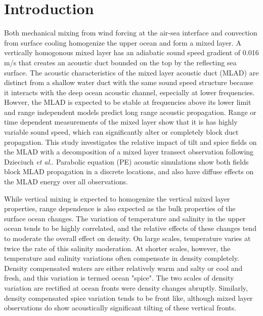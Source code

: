 \documentclass[preprint,NumberedRefs]{JASA}
\begin{document}
\section{\label{sec:intro} Introduction}
Both mechanical mixing from wind forcing at the air-sea interface and convection from surface cooling homogenize the upper ocean and form a mixed layer\citep{cole2010seasonal}. A vertically homogonous mixed layer has an adiabatic sound speed gradient of 0.016 m/s that creates an acoustic duct bounded on the top by the reflecting sea surface. The acoustic characteristics of the mixed layer acoustic duct (MLAD) are distinct from a shallow water duct with the same sound speed structure because it interacts with the deep ocean acoustic channel\citep{porter93}, especially at lower frequencies. Howver, the MLAD is expected to be stable at frequencies above its lower limit\citep{Urick1982Prop} and range independent models predict long range acoustic propagation. Range or time dependent measurements of the mixed layer show that it is has highly variable sound speed\citep{cole2010seasonal,rudnick1999compensation,klymak2015}, which can significantly alter or completely block duct propagation\citep{colosi2020observations,colosi21}. This study investigates the relative impact of tilt and spice fields on the MLAD with a decomposition of a mixed layer transect observation following Dzieciuch \emph{et al.}\citep{dzieciuch2004}. Parabolic equation (PE) acoustic simulations\citep{collins93} show both fields block MLAD propagation in a discrete locations, and also have diffuse effects on the MLAD energy over all observations.

While vertical mixing is expected to homogenize the vertical mixed layer properties, range dependence is also expected as the bulk properties of the surface ocean changes\citep{ferrari2000}. The variation of temperature and salinity in the upper ocean tends to be highly correlated, and the relative effects of these changes tend to moderate the overall effect on density. On large scales, temperature varies at twice the rate of this salinity moderation. At shorter scales, however, the temperature and salinity variations often compensate in density completely. Density compensated waters are either relatively warm and salty or cool and fresh, and this variation is termed ocean "spice"\citep{munk1981evolution}. The two scales of density variation are rectified at ocean fronts were density changes abruptly. Similarly, density compensated spice variation tends to be front like, although mixed layer observations do show acoustically significant tilting of these vertical fronts.
\end{document}
